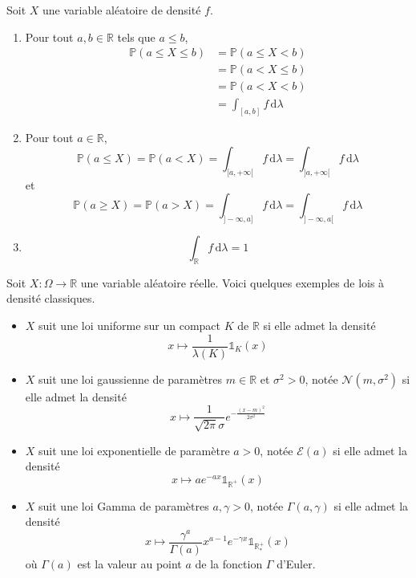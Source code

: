 	\begin{proposition}
		Soit $X$ une variable aléatoire de densité $f$.
		\begin{enumerate}[label=(\roman*)]
			\item Pour tout $a, b \in \mathbb{R}$ tels que $a \leq b$,
			\begin{align*}
				\mathbb{P}(a \leq X \leq b) &= \mathbb{P}(a \leq X < b) \\
				&= \mathbb{P}(a < X \leq b) \\
				&= \mathbb{P}(a < X < b) \\
				&= \int_{[a,b]} f \, \mathrm{d}\lambda
			\end{align*}
			\item Pour tout $a \in \mathbb{R}$,
			\[ \mathbb{P}(a \leq X) = \mathbb{P}(a < X) = \int_{[a,+\infty[} f \, \mathrm{d}\lambda = \int_{]a,+\infty[} f \, \mathrm{d}\lambda \]
			et
			\[ \mathbb{P}(a \geq X) = \mathbb{P}(a > X) = \int_{]-\infty, a]} f \, \mathrm{d}\lambda = \int_{]-\infty, a[} f \, \mathrm{d}\lambda \]
			\item \[ \int_{\mathbb{R}} f \, \mathrm{d}\lambda = 1 \]
		\end{enumerate}
	\end{proposition}
	
	
	\begin{example}
		Soit $X : \Omega \rightarrow \mathbb{R}$ une variable aléatoire réelle. Voici quelques exemples de lois à densité classiques.
		\begin{itemize}
			\item $X$ suit une loi uniforme sur un compact $K$ de $\mathbb{R}$ si elle admet la densité
			\[ x \mapsto \frac{1}{\lambda(K)} \mathbb{1}_K(x) \]
			\item $X$ suit une loi gaussienne de paramètres $m \in \mathbb{R}$ et $\sigma^2 > 0$, notée $\mathcal{N}(m, \sigma^2)$ si elle admet la densité
			\[ x \mapsto \frac{1}{\sqrt{2\pi}\sigma} e^{-\frac{(x-m)^2}{2\sigma^2}} \]
			\item $X$ suit une loi exponentielle de paramètre $a > 0$, notée $\mathcal{E}(a)$ si elle admet la densité
			\[ x \mapsto a e^{-ax} \mathbb{1}_{\mathbb{R}^+}(x) \]
			\item $X$ suit une loi Gamma de paramètres $a, \gamma > 0$, notée $\Gamma(a, \gamma)$ si elle admet la densité
			\[ x \mapsto \frac{\gamma^a}{\Gamma(a)} x^{a-1} e^{-\gamma x} \mathbb{1}_{\mathbb{R}^+_*}(x) \]
			où $\Gamma(a)$ est la valeur au point $a$ de la fonction $\Gamma$ d'Euler.
		\end{itemize}
	\end{example}
	
